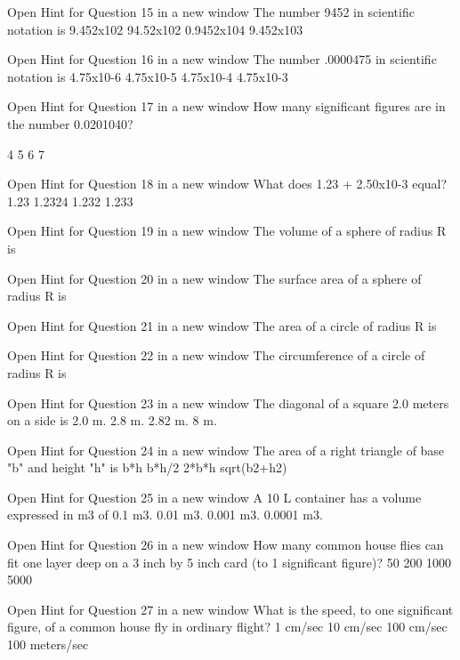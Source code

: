 Open Hint for Question 15 in a new window   The number 9452 in scientific notation is
    9.452x102
    94.52x102
    0.9452x104
    9.452x103
    
Open Hint for Question 16 in a new window   The number .0000475 in scientific notation is
    4.75x10-6
    4.75x10-5
    4.75x10-4
    4.75x10-3
    
Open Hint for Question 17 in a new window   How many significant figures are in the number 0.0201040?
    
    4
    5
    6
    7

Open Hint for Question 18 in a new window   What does 1.23 + 2.50x10-3 equal?
    1.23
    1.2324
    1.232
    1.233

Open Hint for Question 19 in a new window   The volume of a sphere of radius R is
    
Open Hint for Question 20 in a new window   The surface area of a sphere of radius R is
    
Open Hint for Question 21 in a new window   The area of a circle of radius R is

Open Hint for Question 22 in a new window   The circumference of a circle of radius R is

Open Hint for Question 23 in a new window   The diagonal of a square 2.0 meters on a side is
    2.0 m.
    2.8 m.
    2.82 m.
    8 m.

Open Hint for Question 24 in a new window   The area of a right triangle of base "b" and height "h" is
    b*h
    b*h/2
    2*b*h
    sqrt(b2+h2)

Open Hint for Question 25 in a new window   A 10 L container has a volume expressed in m3 of
    0.1 m3.
    0.01 m3.
    0.001 m3.
    0.0001 m3.
    
Open Hint for Question 26 in a new window   How many common house flies can fit one layer deep on a 3 inch by 5 inch card (to 1 significant figure)?
    50
    200
    1000
    5000
    
Open Hint for Question 27 in a new window   What is the speed, to one significant figure, of a common house fly in ordinary flight?
    1 cm/sec
    10 cm/sec
    100 cm/sec
    100 meters/sec


